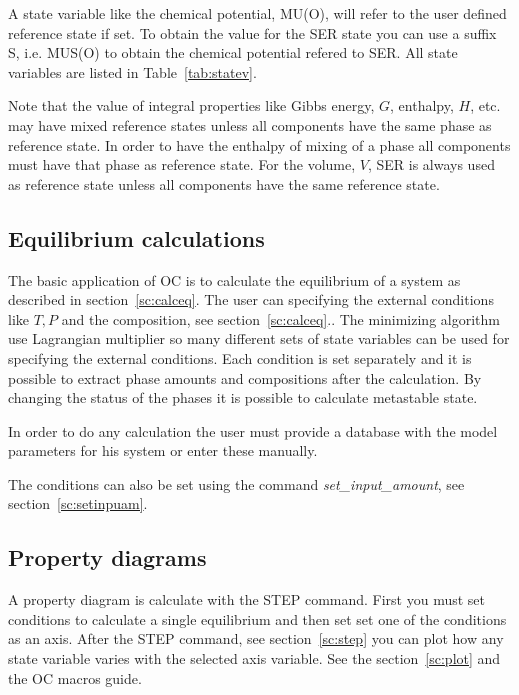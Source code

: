 \documentclass[11pt]{article}
\begin{document}
A state variable like the chemical potential, MU(O), will refer to the
user defined reference state if set.  To obtain the value for the SER
state you can use a suffix S, i.e. MUS(O) to obtain the chemical
potential refered to SER.  All state variables are listed in
Table~\ref{tab:statev}.

Note that the value of integral properties like Gibbs energy, $G$,
enthalpy, $H$, etc. may have mixed reference states unless all
components have the same phase as reference state.  In order to have
the enthalpy of mixing of a phase all components must have that phase
as reference state.  For the volume, $V$, SER is always used as
reference state unless all components have the same reference state.

\hypertarget{Info equilibrium}{}
\subsection{Equilibrium calculations}

The basic application of OC is to calculate the equilibrium of a
system as described in section~\ref{sc:calceq}.  The user can
specifying the external conditions like $T, P$ and the composition,
see section~\ref{sc:calceq}..  The minimizing algorithm~\cite{15Sun2}
use Lagrangian multiplier so many different sets of state variables
can be used for specifying the external conditions. Each condition is
set separately and it is possible to extract phase amounts and
compositions after the calculation.  By changing the status of the
phases it is possible to calculate metastable state.

In order to do any calculation the user must provide a database with
the model parameters for his system or enter these manually.

The conditions can also be set using the command {\em
  set\_input\_amount}, see section~\ref{sc:setinpuam}.

\hypertarget{Info propertydiagram}{}
\subsection{Property diagrams}

A property diagram is calculate with the STEP command.  First you must
set conditions to calculate a single equilibrium and then set set one
of the conditions as an axis.  After the STEP command, see
section~\ref{sc:step} you can plot how any state variable varies with
the selected axis variable.  See the section~\ref{sc:plot} and the OC
macros guide.
\end{document}
